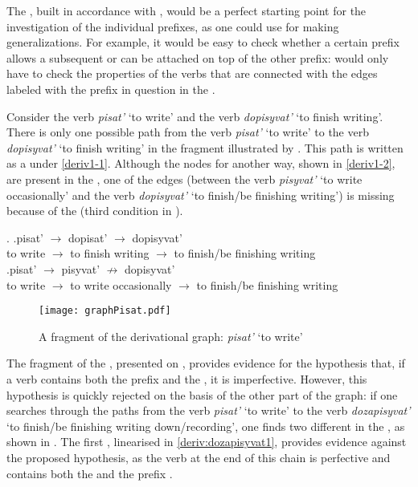 The , built in accordance with , would be a perfect starting point for the investigation of the individual prefixes, as one could use  for making generalizations. For example, it would be easy to check whether a certain prefix allows a subsequent  or can be attached on top of the other prefix: would only have to check the properties of the verbs that are connected with the edges labeled with the prefix in question in the . 

Consider the verb \textit{pisat'} `to write' and the verb \textit{dopisyvat'} `to finish writing'. There is only one possible path from the verb \textit{pisat'} `to write' to the verb \textit{dopisyvat'} `to finish writing' in the  fragment illustrated by . This path is written as a  under \ref{deriv1-1}. Although the nodes for another way, shown in \ref{deriv1-2}, are present in the , one of the edges (between the verb \textit{pisyvat'} `to write occasionally' and the verb \textit{dopisyvat'} `to finish/be finishing writing') is missing because of the  (third condition in ).

\ex.\label{deriv1} \ag.\label{deriv1-1}pisat'\textsuperscript{\IPF} $\rightarrow$ dopisat'\textsuperscript{\PF} $\rightarrow$ dopisyvat'\textsuperscript{\IPF}\\
{to write} $\rightarrow$ {to finish writing} $\rightarrow$ {to finish/be finishing writing}\\
\bg.\label{deriv1-2}pisat'\textsuperscript{\IPF} $\rightarrow$ pisyvat'\textsuperscript{\IPF} $\nrightarrow$ dopisyvat'\\
{to write} $\rightarrow$ {to write occasionally} $\rightarrow$ {to finish/be finishing writing}\\

\begin{figure}
\texttt{[image: graphPisat.pdf]}
\caption{A fragment of the derivational graph: \textit{pisat'} `to write'\label{tree:dopisyvat}}
\end{figure}

The fragment of the , presented on , provides evidence for the hypothesis that, if a verb contains both the prefix  and the , it is imperfective. However, this hypothesis is quickly rejected on the basis of the other part of the graph: if one searches through the paths from the verb \textit{pisat'} `to write' to the verb \textit{dozapisyvat'} `to finish/be finishing writing down/recording', one finds two different  in the , as shown in . The first , linearised in \ref{deriv:dozapisyvat1}, provides evidence against the proposed hypothesis, as the verb at the end of this chain is perfective and contains both the  and the prefix . 

